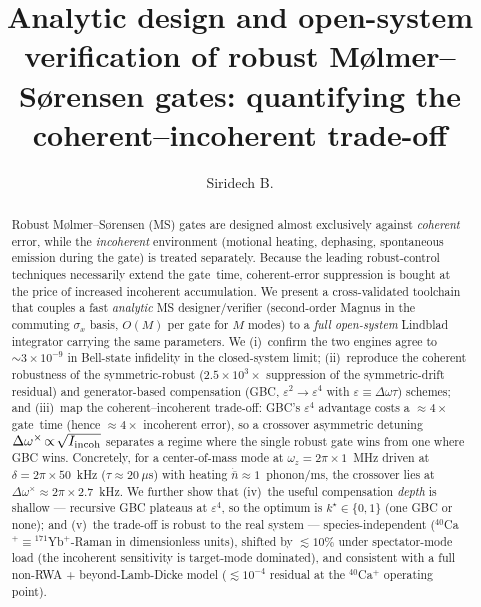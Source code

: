 \documentclass[aps,prapplied,twocolumn,superscriptaddress,floatfix,nofootinbib]{revtex4-2}
\begin{document}
\title{Analytic design and open-system verification of robust M\o lmer--S\o rensen
gates: quantifying the coherent--incoherent trade-off}

\author{Siridech B.}

\begin{abstract}
Robust M\o lmer--S\o rensen (MS) gates are designed almost exclusively against
\emph{coherent} error, while the \emph{incoherent} environment (motional heating,
dephasing, spontaneous emission during the gate) is treated separately. Because the
leading robust-control techniques necessarily extend the gate~time, coherent-error
suppression is bought at the price of increased incoherent accumulation. We present a
cross-validated toolchain that couples a fast \emph{analytic} MS designer/verifier
(second-order Magnus in the commuting $\sigma_x$ basis, $O(M)$ per gate for $M$ modes)
to a \emph{full open-system} Lindblad integrator carrying the same parameters. We
(i)~confirm the two engines agree to $\sim\!3\times10^{-9}$ in Bell-state infidelity in
the closed-system limit; (ii)~reproduce the coherent robustness of the symmetric-robust
($2.5\times10^{3}\times$ suppression of the symmetric-drift residual) and generator-based
compensation (GBC, $\varepsilon^2\!\to\!\varepsilon^4$ with $\varepsilon\equiv\Delta\omega\tau$)
schemes; and (iii)~map the coherent--incoherent trade-off: GBC's $\varepsilon^4$ advantage
costs a $\approx\!4\times$ gate~time (hence $\approx\!4\times$ incoherent error), so a
crossover asymmetric detuning $\Delta\omega^\times\!\propto\!\sqrt{I_{\rm incoh}}$ separates
a regime where the single robust gate wins from one where GBC wins. Concretely, for a
center-of-mass mode at $\omega_z=2\pi\times1$~MHz driven at $\delta=2\pi\times50$~kHz
($\tau\approx20~\mu$s) with heating $\dot{\bar n}\approx1$~phonon/ms, the crossover lies at
$\Delta\omega^\times\approx2\pi\times2.7$~kHz. We further show that (iv)~the useful
compensation \emph{depth} is shallow --- recursive GBC plateaus at $\varepsilon^4$, so the
optimum is $k^\star\!\in\!\{0,1\}$ (one GBC or none); and (v)~the trade-off is robust to the
real system --- species-independent (${}^{40}$Ca$^+\!\equiv\!{}^{171}$Yb$^+$-Raman in
dimensionless units), shifted by $\lesssim\!10\%$ under spectator-mode load (the incoherent
sensitivity is target-mode dominated), and consistent with a full non-RWA + beyond-Lamb-Dicke
model ($\lesssim\!10^{-4}$ residual at the ${}^{40}$Ca$^+$ operating point).
\end{abstract}
\end{document}
